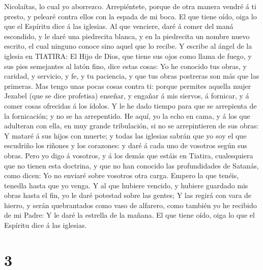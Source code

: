 Nicolaítas, lo cual yo aborrezco.  Arrepiéntete, porque de
otra manera vendré á ti presto, y pelearé contra ellos con la espada de
mi boca.  El que tiene oído, oiga lo que el Espíritu dice á
las iglesias. Al que venciere, daré á comer del maná escondido, y le
daré una piedrecita blanca, y en la piedrecita un nombre nuevo escrito,
el cual ninguno conoce sino aquel que lo recibe.  Y escribe
al ángel de la iglesia en TIATIRA: El Hijo de Dios, que tiene sus ojos
como llama de fuego, y sus pies semejantes al latón fino, dice estas
cosas:  Yo he conocido tus obras, y caridad, y servicio, y
fe, y tu paciencia, y que tus obras postreras son más que las primeras.
 Mas tengo unas pocas cosas contra ti: porque permites
aquella mujer Jezabel (que se dice profetisa) enseñar, y engañar á mis
siervos, á fornicar, y á comer cosas ofrecidas á los ídolos.
 Y le he dado tiempo para que se arrepienta de la
fornicación; y no se ha arrepentido.  He aquí, yo la echo
en cama, y á los que adulteran con ella, en muy grande tribulación, si
no se arrepintieren de sus obras:  Y mataré á sus hijos con
muerte; y todas las iglesias sabrán que yo soy el que escudriño los
riñones y los corazones: y daré á cada uno de vosotros según sus obras.
 Pero yo digo á vosotros, y á los demás que estáis en
Tiatira, cualesquiera que no tienen esta doctrina, y que no han conocido
las profundidades de Satanás, como dicen: Yo no enviaré sobre vosotros
otra carga.  Empero la que tenéis, tenedla hasta que yo
venga.  Y al que hubiere vencido, y hubiere guardado mis
obras hasta el fin, yo le daré potestad sobre las gentes; 
Y las regirá con vara de hierro, y serán quebrantados como vaso de
alfarero, como también yo he recibido de mi Padre:  Y le
daré la estrella de la mañana.  El que tiene oído, oiga lo
que el Espíritu dice á las iglesias.

\hypertarget{section-2}{%
\section{3}\label{section-2}}

